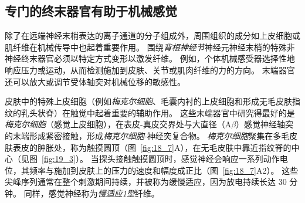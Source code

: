\subsection{专门的终末器官有助于机械感觉}

除了在远端神经末梢表达的离子通道的分子组成外，周围组织的成分如上皮细胞或肌纤维在机械传导中也起着重要作用。
围绕\textit{背根神经节}神经元神经末梢的特殊非神经终末器官必须以特定方式变形以激发纤维。
例如，个体机械感受器选择性地响应压力或运动，从而检测施加到皮肤、关节或肌肉纤维的力的方向。
末端器官还可以放大或调节受体轴突对机械位移的敏感性。


皮肤中的特殊上皮细胞（例如\textit{梅克尔细胞}、毛囊内衬的上皮细胞和形成无毛皮肤指纹的乳头状脊）在触觉中起着重要的辅助作用。
这些末端器官中研究得最好的是\textit{梅克尔细胞}（感觉上皮细胞），在表皮-真皮交界处与大直径（A$\beta$）感觉神经轴突的末端形成紧密接触，形成\textit{梅克尔细胞}-神经突复合物。
\textit{梅克尔细胞}聚集在多毛皮肤表皮的肿胀处，称为触摸圆顶（图~\ref{fig:18_7}A），在无毛皮肤中靠近指纹脊的中心（见图~\ref{fig:19_3}）。
当探头接触触摸圆顶时，感觉神经会响应一系列动作电位，其频率与施加到皮肤上的压力的速度和幅度成正比（图~\ref{fig:18_7}A2）。
这些尖峰序列通常在整个刺激期间持续，并被称为缓慢适应，因为放电持续长达 30 分钟。
同样，感觉神经称为\textit{慢适应1型}纤维。


